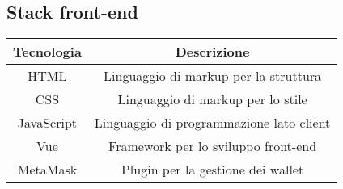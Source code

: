\subsection{Stack front-end}
\begin{center}
    \begin{tabular}{|c|c|}
        \hline
             \textbf{}Tecnologia  &  \textbf{}Descrizione \\
             \hline
             HTML  & Linguaggio di markup per la struttura  \\
             \hline
             CSS & Linguaggio di markup per lo stile \\
             \hline
             JavaScript & Linguaggio di programmazione lato client \\
             \hline
             Vue & Framework per lo sviluppo front-end \\
             \hline
             MetaMask & Plugin per la gestione dei wallet \\
        \hline
    \end{tabular}
\end{center}